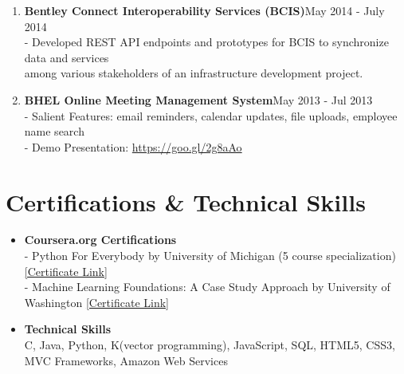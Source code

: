 \documentclass{article}
\begin{document}
\begin{enumerate}
    \item \textbf{Bentley Connect Interoperability Services (BCIS)}{\hfill May 2014 - July 2014}\\
    - Developed REST API endpoints and prototypes for BCIS to synchronize data and services\\
    \hspace*{0.7em}among various stakeholders of an infrastructure development project.
    
    \item \textbf{BHEL Online Meeting Management System}{\hfill May 2013 - Jul 2013}\\
    - Salient Features: email reminders, calendar updates, file uploads, employee name search\\
    - Demo Presentation: \href{https://goo.gl/2g8aAo}{https://goo.gl/2g8aAo}

\end{enumerate}


\section*{Certifications \& Technical Skills}
\begin{itemize}
    \item \textbf{Coursera.org Certifications}\\
    - Python For Everybody by University of Michigan (5 course specialization) \href{https://www.coursera.org/account/accomplishments/specialization/2B5PCJGZ9WEE}{[Certificate Link]}\\
    - Machine Learning Foundations: A Case Study Approach by University of Washington \href{https://www.coursera.org/account/accomplishments/certificate/NDVXWMCYKX9N}{[Certificate Link]}
    
    \item \textbf{Technical Skills}\\
    C, Java, Python, K(vector programming), JavaScript, SQL, HTML5, CSS3, MVC Frameworks, Amazon Web Services
\end{itemize}
\end{document}
